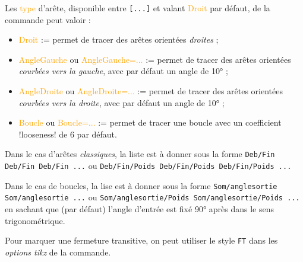 \documentclass[french,a4paper,11pt]{article}
\newcommand\Cle[1]{{\small\sffamily\textlangle \textcolor{orange}{#1}\textrangle}}
\begin{document}
{{\begin{tipblock}
\smallskip

Les \Cle{type} d'arête, disponible entre \texttt{[...]} et valant \Cle{Droit} par défaut, de la commande peut valoir :

\begin{itemize}
	\item \Cle{Droit} := permet de tracer des arêtes orientées \textit{droites} ;
	\item \Cle{AngleGauche} ou \Cle{AngleGauche=...} := permet de tracer des arêtes orientées \textit{courbées vers la gauche}, avec par défaut un angle de 10° ;
	\item \Cle{AngleDroite} ou \Cle{AngleDroite=...} := permet de tracer des arêtes orientées \textit{courbées vers la droite}, avec par défaut un angle de 10° ;
	\item \Cle{Boucle} ou \Cle{Boucle=...} := permet de tracer une boucle avec un coefficient \motcletex!looseness! de 6 par défaut.
\end{itemize}

Dans le cas d'arêtes \textit{classiques}, la liste est à donner sous la forme \verb|Deb/Fin Deb/Fin Deb/Fin ...| ou \verb|Deb/Fin/Poids Deb/Fin/Poids Deb/Fin/Poids ...|

\smallskip

Dans le cas de boucles, la lise est à donner sous la forme \verb|Som/anglesortie Som/anglesortie ...| ou \verb|Som/anglesortie/Poids Som/anglesortie/Poids ...| en sachant que (par défaut) l'angle d'entrée est fixé 90° après dans le sens trigonométrique.

\smallskip

Pour marquer une fermeture transitive, on peut utiliser le style \verb|FT| dans les \textit{options tikz} de la commande.
\end{tipblock}

\begin{DemoCode}[]
\begin{GrapheTikz}
\end{GrapheTikz}
\hspace{5mm}
\begin{GrapheTikz}
\end{GrapheTikz}
\hspace{5mm}
\begin{GrapheTikz}
\end{GrapheTikz}
\end{DemoCode}

}}
\end{document}
